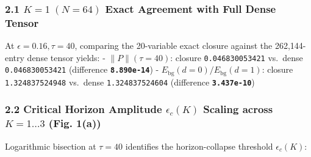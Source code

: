\documentclass[
  a4paper,
]{article}
\begin{document}
\subsubsection{\texorpdfstring{2.1 \(K=1\;(N=64)\) Exact Agreement with
Full Dense
Tensor}{2.1 K=1\textbackslash;(N=64) Exact Agreement with Full Dense Tensor}}\label{k1n64-exact-agreement-with-full-dense-tensor}

At \(\epsilon = 0.16, \tau = 40\), comparing the 20-variable exact
closure against the 262,144-entry dense tensor yields: -
\(\|P\|(\tau=40)\): closure \texttt{0.046830053421} vs.~dense
\texttt{0.046830053421} (difference \textbf{\texttt{8.890e-14}}) -
\(E_{\mathrm{bg}}(d=0)/E_{\mathrm{bg}}(d=1)\): closure
\texttt{1.324837524948} vs.~dense \texttt{1.324837524604} (difference
\textbf{\texttt{3.437e-10}})

\subsubsection{\texorpdfstring{2.2 Critical Horizon Amplitude
\(\epsilon_c(K)\) Scaling across \(K=1\dots 3\) (Fig.
1(a))}{2.2 Critical Horizon Amplitude \textbackslash epsilon\_c(K) Scaling across K=1\textbackslash dots 3 (Fig. 1(a))}}\label{critical-horizon-amplitude-epsilon_ck-scaling-across-k1dots-3-fig.-1a}

Logarithmic bisection at \(\tau=40\) identifies the horizon-collapse
threshold \(\epsilon_c(K)\):
\end{document}
